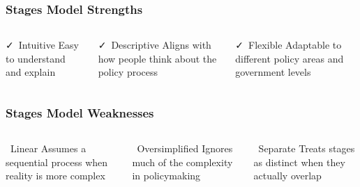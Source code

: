 \documentclass[10pt]{beamer}
\begin{document}
\begin{frame}
\frametitle{Stages Model Strengths}

\begin{columns}
\begin{column}{0.32\textwidth}
\begin{block}{\faCheck\ Intuitive}
\pause
Easy to understand and explain
\end{block}
\end{column}

\begin{column}{0.32\textwidth}
\begin{block}{\faCheck\ Descriptive}
\pause
Aligns with how people think about the policy process
\end{block}
\end{column}

\begin{column}{0.32\textwidth}
\begin{block}{\faCheck\ Flexible}
\pause
Adaptable to different policy areas and government levels
\end{block}
\end{column}
\end{columns}

\end{frame}

\begin{frame}
\frametitle{Stages Model Weaknesses}

\begin{columns}
\begin{column}{0.32\textwidth}
\begin{alertblock}{\faTimes\ Linear}
\pause
Assumes a sequential process when reality is more complex
\end{alertblock}
\end{column}

\begin{column}{0.32\textwidth}
\begin{alertblock}{\faTimes\ Oversimplified}
\pause
Ignores much of the complexity in policymaking
\end{alertblock}
\end{column}

\begin{column}{0.32\textwidth}
\begin{alertblock}{\faTimes\ Separate}
\pause
Treats stages as distinct when they actually overlap
\end{alertblock}
\end{column}
\end{columns}

\end{frame}
\end{document}
